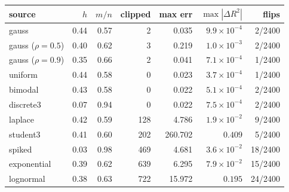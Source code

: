 \begin{tabular}{lrrrrrr}
\toprule
source & $h$ & $m/n$ & clipped & max err & $\max|\Delta R^2|$ & flips \\
\midrule
gauss & 0.44 & 0.57 & 2 & 0.035 & $9.9\times10^{-4}$ & 2/2400 \\
gauss ($\rho=0.5$) & 0.40 & 0.62 & 3 & 0.219 & $1.0\times10^{-3}$ & 2/2400 \\
gauss ($\rho=0.9$) & 0.35 & 0.66 & 2 & 0.041 & $7.1\times10^{-4}$ & 1/2400 \\
uniform & 0.44 & 0.58 & 0 & 0.023 & $3.7\times10^{-4}$ & 1/2400 \\
bimodal & 0.43 & 0.58 & 0 & 0.022 & $5.1\times10^{-4}$ & 2/2400 \\
discrete3 & 0.07 & 0.94 & 0 & 0.022 & $7.5\times10^{-4}$ & 2/2400 \\
laplace & 0.42 & 0.59 & 128 & 4.786 & $1.9\times10^{-2}$ & 9/2400 \\
student3 & 0.41 & 0.60 & 202 & 260.702 & $0.409$ & 5/2400 \\
spiked & 0.03 & 0.98 & 469 & 4.681 & $3.6\times10^{-2}$ & 18/2400 \\
exponential & 0.39 & 0.62 & 639 & 6.295 & $7.9\times10^{-2}$ & 15/2400 \\
lognormal & 0.38 & 0.63 & 722 & 15.972 & $0.195$ & 24/2400 \\
\bottomrule
\end{tabular}
